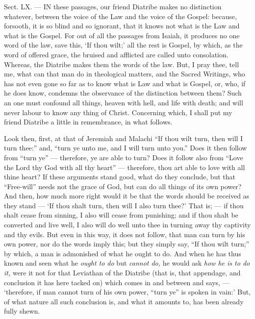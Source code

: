 
Sect. LX. — IN these passages, our friend Diatribe makes no distinction whatever, between the voice of the Law and the voice of the Gospel: because, forsooth, it is so blind and so ignorant, that it knows not what is the Law and what is the Gospel. For out of all the passages from Isaiah, it produces no one word of the law, save this, ‘If thou wilt;’ all the rest is Gospel, by which, as the word of offered grace, the bruised and afflicted are called unto consolation. Whereas, the Diatribe makes them the words of the law. But, I pray thee, tell me, what can that man do in theological matters, and the Sacred Writings, who has not even gone so far as to know what is Law and what is Gospel, or, who, if he does know, condemns the observance of the distinction between them? Such an one must confound all things, heaven with hell, and life with death; and will never labour to know any thing of Christ. Concerning which, I shall put my friend Diatribe a little in remembrance, in what follows.

Look then, first, at that of Jeremiah and Malachi “If thou wilt turn, then will I turn thee:” and, “turn ye unto me, and I will turn unto you.” Does it then follow from “turn ye” — therefore, ye are able to turn? Does it follow also from “Love the Lord thy God with all thy heart” — therefore, thou art able to love with all thine heart? If these arguments stand good, what do they conclude, but that “Free-will” needs not the grace of God, but can do all things of its own power? And then, how much more right would it be that the words should be received as they stand — ‘If thou shalt turn, then will I also turn thee?’ That is; — if thou shalt cease from sinning, I also will cease from punishing; and if thou shalt be converted and live well, I also will do well unto thee in turning away thy captivity and thy evils. But even in this way, it does not follow, that man can turn by his own power, nor do the words imply this; but they simply say, “If thou wilt turn;” by which, a man is admonished of what he ought to do. And when he has thus known and seen what he \emph{ought to do }but \emph{cannot do, }he would ask \emph{how he is to do it, }were it not for that Leviathan of the Diatribe (that is, that appendage, and conclusion it has here tacked on) which comes in and between and says, — ‘therefore, if man cannot turn of his own power, “turn ye” is spoken in vain:’ But, of what nature all such conclusion is, and what it amounts to, has been already fully shewn.

